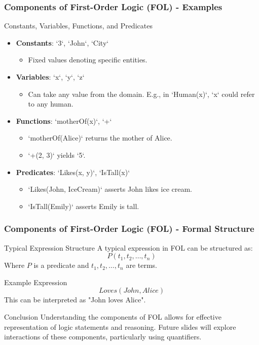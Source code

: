 \documentclass[aspectratio=169]{beamer}
\begin{document}
\begin{frame}[fragile]
  \frametitle{Components of First-Order Logic (FOL) - Examples}
  \begin{block}{Constants, Variables, Functions, and Predicates}
    \begin{itemize}
      \item \textbf{Constants}: `3`, `John`, `City`
        \begin{itemize}
          \item Fixed values denoting specific entities.
        \end{itemize}

      \item \textbf{Variables}: `x`, `y`, `z`
        \begin{itemize}
          \item Can take any value from the domain. E.g., in `Human(x)`, `x` could refer to any human.
        \end{itemize}

      \item \textbf{Functions}: `motherOf(x)`, `+`
        \begin{itemize}
          \item `motherOf(Alice)` returns the mother of Alice.
          \item `+(2, 3)` yields `5`.
        \end{itemize}

      \item \textbf{Predicates}: `Likes(x, y)`, `IsTall(x)`
        \begin{itemize}
          \item `Likes(John, IceCream)` asserts John likes ice cream.
          \item `IsTall(Emily)` asserts Emily is tall.
        \end{itemize}
    \end{itemize}
  \end{block}
\end{frame}

\begin{frame}[fragile]
  \frametitle{Components of First-Order Logic (FOL) - Formal Structure}
  \begin{block}{Typical Expression Structure}
    A typical expression in FOL can be structured as:
    \[
    P(t_1, t_2, \ldots, t_n)
    \]
    Where $P$ is a predicate and $t_1, t_2, \ldots, t_n$ are terms.
  \end{block}

  \begin{block}{Example Expression}
    \[
    Loves(John, Alice)
    \]
    This can be interpreted as "John loves Alice".
  \end{block}

  \begin{block}{Conclusion}
    Understanding the components of FOL allows for effective representation of logic statements and reasoning. Future slides will explore interactions of these components, particularly using quantifiers.
  \end{block}
\end{frame}
\end{document}
